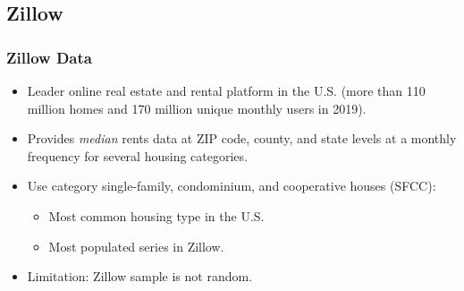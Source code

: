 
\subsection{Zillow}

\begin{frame}[label = zillow]
	\frametitle{Zillow Data}
	
	\begin{itemize}
		\item Leader online real estate and rental platform in the U.S. {\small (more 
		than 110 million homes and 170 million unique monthly users in 2019).}
		
		\vspace{2mm} \item
		Provides \textit{median} rents data at ZIP code, county, and state levels 
		at a monthly frequency for several housing categories.
		
		\pause
		\vspace{2mm} \item
		Use category single-family, condominium, and cooperative houses (SFCC):
		\begin{itemize}
			\item Most common housing type in the U.S.
			\item Most populated series in Zillow.
		\end{itemize}
		
		\pause
		\vspace{2mm} \item
		Limitation: Zillow sample is not random.
	\end{itemize}
\end{frame}

